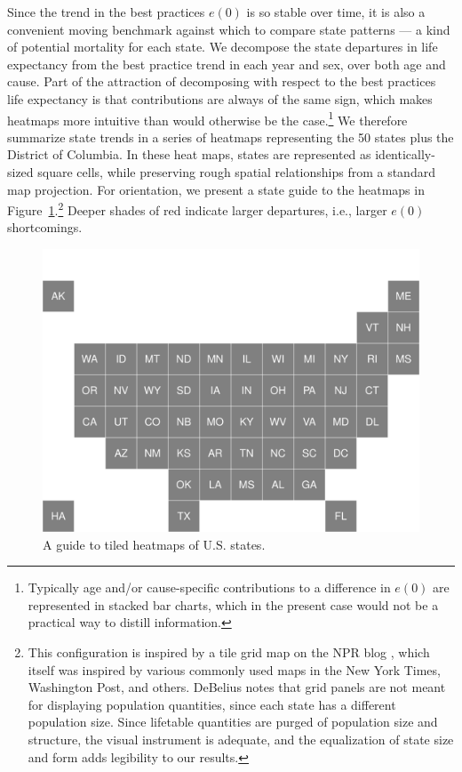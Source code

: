 \documentclass[11pt,oneside,a4paper]{article} %
\begin{document}
Since the trend in the best practices $e(0)$ is so stable over time, it
is also a convenient moving benchmark against which to compare state patterns
--- a kind of potential mortality for each state. We
decompose the state departures in life expectancy from the best practice trend in each year and sex, over both age and cause. Part of the attraction of decomposing with respect to the best practices life expectancy is that contributions are always of the same sign, which makes heatmaps more intuitive than would otherwise be the case.\footnote{Typically age and/or cause-specific contributions to a difference in $e(0)$ are represented in stacked bar charts, which in the present case would not be a practical way to distill information.} We therefore summarize state trends in a series of heatmaps representing the 50 states plus the District of Columbia. In these heat maps, states are represented as identically-sized square cells, while preserving rough spatial relationships from a standard map projection. For orientation, we present a state guide to the heatmaps in Figure~\ref{fig:heatguide}.\footnote{This configuration is inspired by a tile grid map on the
NPR blog \citep{NPRsquares}, which
itself was inspired by various commonly used maps in the New York Times,
Washington Post, and others. DeBelius notes that grid panels are not meant for
displaying population quantities, since each state has a different population
size. Since lifetable quantities are purged of population size and
structure, the visual instrument is adequate, and the equalization of state
size and form adds legibility to our results.} Deeper shades of red
indicate larger departures, i.e., larger $e(0)$ shortcomings.

\begin{figure}
\centering
\caption{A guide to tiled heatmaps of U.S. states.}
\label{fig:heatguide}
\includegraphics[scale=.3]{Figures/StatesDiagram.pdf}
\end{figure}
\end{document}
